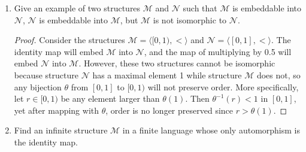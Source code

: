 \documentclass{article}
\begin{document}
\begin{enumerate}
\begin{enumerate}
      \item $\mathcal{M}=\langle\mathbb{N}\setminus\{0\},\cdot,1\rangle$ and
        $\mathcal{N}=\langle\mathbb{N},+,0\rangle$
        \begin{proof}
          No such embedding exists. Assume that an embedding
          $\alpha:\mathbb{N}\hookrightarrow\mathbb{N}$ exists. Since
          embeddings preserve function maps, we can prove by induction on
          $k$ that for any $n\in\mathbb{N}\setminus\{0\}$,
          $\alpha(n^k)=k\cdot \alpha(n)$.  Let $m=\alpha(2)$ and
          $n=\alpha(3)$. Note that $m\neq0$ and $n\neq0$ since
          $\alpha(1)=0$ and $\alpha$ is injective. Then $\alpha(2^n)=n\cdot
          m=m\cdot n=\alpha(3^m)$, yet $2^n\neq3^m$ since $m,n\neq0$,
          contradicting the injectiveness of $\alpha$.
        \end{proof}
    \end{enumerate}

  \item Give an example of two structures $\mathcal{M}$ and $\mathcal{N}$
    such that $\mathcal{M}$ is embeddable into $\mathcal{N}$, $\mathcal{N}$
    is embeddable into $\mathcal{M}$, but $\mathcal{M}$ is not isomorphic
    to $\mathcal{N}$.

    \begin{proof}
      Consider the structures $\mathcal{M}=\langle[0,1),<\rangle$ and
      $\mathcal{N}=\langle[0,1],<\rangle$. The identity map will embed
      $\mathcal{M}$ into $\mathcal{N}$, and the map of multiplying by 0.5
      will embed $\mathcal{N}$ into $\mathcal{M}$. However, these two
      structures cannot be isomorphic because structure $\mathcal{N}$ has a
      maximal element 1 while structure $\mathcal{M}$ does not, so any
      bijection $\theta$ from $[0,1]$ to $[0,1)$ will not preserve order.
      More specifically, let $r\in[0,1)$ be any element larger than
      $\theta(1)$. Then $\theta^{-1}(r)<1$ in $[0,1]$, yet after mapping
      with $\theta$, order is no longer preserved since $r>\theta(1)$.
    \end{proof}

  \item Find an infinite structure $\mathcal{M}$ in a finite language whose
    only automorphism is the identity map.


\end{enumerate}
\end{document}
